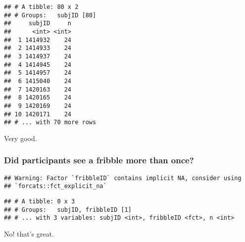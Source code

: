 \documentclass[
]{article}
\newenvironment{Shaded}{\begin{snugshade}}{\end{snugshade}}
\newcommand{\DecValTok}[1]{\textcolor[rgb]{0.00,0.00,0.81}{#1}}
\newcommand{\KeywordTok}[1]{\textcolor[rgb]{0.13,0.29,0.53}{\textbf{#1}}}
\newcommand{\NormalTok}[1]{#1}
\newcommand{\OperatorTok}[1]{\textcolor[rgb]{0.81,0.36,0.00}{\textbf{#1}}}
\newcommand{\StringTok}[1]{\textcolor[rgb]{0.31,0.60,0.02}{#1}}
\begin{document}
\begin{Shaded}
\end{Shaded}

\begin{verbatim}
## # A tibble: 80 x 2
## # Groups:   subjID [80]
##     subjID     n
##      <int> <int>
##  1 1414932    24
##  2 1414933    24
##  3 1414937    24
##  4 1414945    24
##  5 1414957    24
##  6 1415040    24
##  7 1420163    24
##  8 1420165    24
##  9 1420169    24
## 10 1420171    24
## # ... with 70 more rows
\end{verbatim}

Very good.

\hypertarget{did-participants-see-a-fribble-more-than-once}{%
\subsubsection{Did participants see a fribble more than
once?}\label{did-participants-see-a-fribble-more-than-once}}

\begin{Shaded}
\end{Shaded}

\begin{verbatim}
## Warning: Factor `fribbleID` contains implicit NA, consider using
## `forcats::fct_explicit_na`
\end{verbatim}

\begin{verbatim}
## # A tibble: 0 x 3
## # Groups:   subjID, fribbleID [1]
## # ... with 3 variables: subjID <int>, fribbleID <fct>, n <int>
\end{verbatim}

No! that's great.
\end{document}
